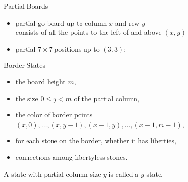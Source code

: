 \documentclass{prosper}
\newcommand{\my}[2]{{#1 \choose #2}}
\begin{document}
\begin{slide}{Partial Boards}
\begin{itemize}
\item partial go board up to column $x$ and row $y$ \\
      consists of all the points to the left of and above $(x,y)$
\item partial $7\times 7$ positions up to $(3,3)$:
{\epsfxsize=10cm }
\end{itemize}
\end{slide}

\begin{slide}{Border States}
\begin{itemize}
\item the board height $m$,
\item the size $0 \leq y <m $ of the partial column,
\item the color of border points
      $(x,0),\ldots,(x,y-1),(x-1,y),\ldots,(x-1,m-1)$,
\item for each stone on the border, whether it has liberties,
\item connections among libertyless stones.
\end{itemize}
A state with partial column size $y$ is called a $y$-state.
\end{slide}


\end{document}
